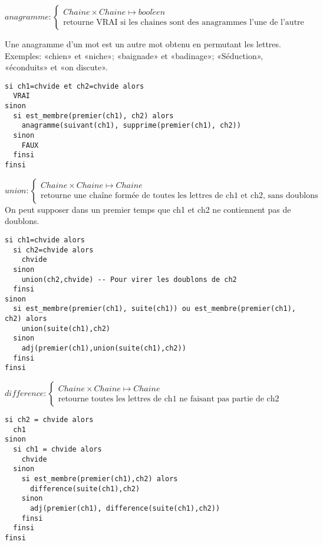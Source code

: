 \documentclass[10pt]{article}\usepackage[correction,nu]{esial}
\begin{document}
\begin{Question}
  $anagramme: \left\{
    \begin{array}{l}
      Chaine\times Chaine\mapsto bool\acute{e}en\\
      \text{retourne VRAI si les chaines sont des anagrammes l'une de l'autre}
    \end{array}\right.$  

  Une anagramme d'un mot est un autre mot obtenu en permutant les lettres.
  Exemples: «chien» et «niche»; «baignade» et «badinage»; «Séduction»,
  «éconduits» et «on discute».
\end{Question}
\begin{Reponse}
  \begin{Verbatim}[label=anagramme(ch1\quotesinglbase ch2)]
si ch1=chvide et ch2=chvide alors
  VRAI
sinon
  si est_membre(premier(ch1), ch2) alors
    anagramme(suivant(ch1), supprime(premier(ch1), ch2))
  sinon
    FAUX
  finsi
finsi
  \end{Verbatim}
\end{Reponse}

\begin{Question}
  $union: \left\{
    \begin{array}{l}
      Chaine\times Chaine\mapsto Chaine\\
      \text{retourne une chaîne formée de toutes les lettres de ch1 et ch2,
        sans doublons}
    \end{array}\right.$    
  On peut supposer dans un premier temps que ch1 et ch2 ne contiennent pas de
  doublons.
\end{Question}
\begin{Reponse}
  \begin{Verbatim}[label=union(ch1\quotesinglbase ch2)]
si ch1=chvide alors
  si ch2=chvide alors
    chvide
  sinon
    union(ch2,chvide) -- Pour virer les doublons de ch2
  finsi
sinon
  si est_membre(premier(ch1), suite(ch1)) ou est_membre(premier(ch1), ch2) alors
    union(suite(ch1),ch2)
  sinon
    adj(premier(ch1),union(suite(ch1),ch2))
  finsi
finsi    
  \end{Verbatim}
\end{Reponse}

\begin{Question}
  $difference: \left\{
    \begin{array}{l}
      Chaine\times Chaine\mapsto Chaine\\
      \text{retourne toutes les lettres de ch1 ne faisant
        pas partie de ch2}
    \end{array}\right.$    
\end{Question}
\begin{Reponse}
  \begin{Verbatim}[label=difference(ch1\quotesinglbase ch2)]
si ch2 = chvide alors
  ch1
sinon 
  si ch1 = chvide alors
    chvide
  sinon
    si est_membre(premier(ch1),ch2) alors
      difference(suite(ch1),ch2)
    sinon
      adj(premier(ch1), difference(suite(ch1),ch2))
    finsi
  finsi
finsi    
  \end{Verbatim}
\end{Reponse}
\end{document}
